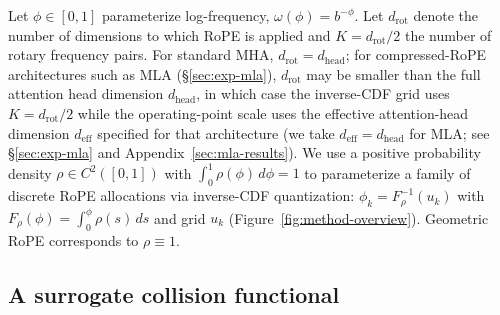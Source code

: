 Let $\phi \in [0,1]$ parameterize log-frequency, $\omega(\phi) = b^{-\phi}$. Let $d_{\mathrm{rot}}$ denote the number of dimensions to which RoPE is applied and $K = d_{\mathrm{rot}}/2$ the number of rotary frequency pairs. For standard MHA, $d_{\mathrm{rot}} = d_{\mathrm{head}}$; for compressed-RoPE architectures such as MLA (\S\ref{sec:exp-mla}), $d_{\mathrm{rot}}$ may be smaller than the full attention head dimension $d_{\mathrm{head}}$, in which case the inverse-CDF grid uses $K = d_{\mathrm{rot}}/2$ while the operating-point scale uses the effective attention-head dimension $d_{\mathrm{eff}}$ specified for that architecture (we take $d_{\mathrm{eff}}{=}d_{\mathrm{head}}$ for MLA; see \S\ref{sec:exp-mla} and Appendix~\ref{sec:mla-results}). We use a positive probability density $\rho \in C^2([0,1])$ with $\int_0^1\rho(\phi)\,d\phi = 1$ to parameterize a family of discrete RoPE allocations via inverse-CDF quantization: $\phi_k = F_\rho^{-1}(u_k)$ with $F_\rho(\phi) = \int_0^\phi\rho(s)\,ds$ and grid $u_k$ (Figure~\ref{fig:method-overview}). Geometric RoPE corresponds to $\rho \equiv 1$.

\subsection{A surrogate collision functional}


